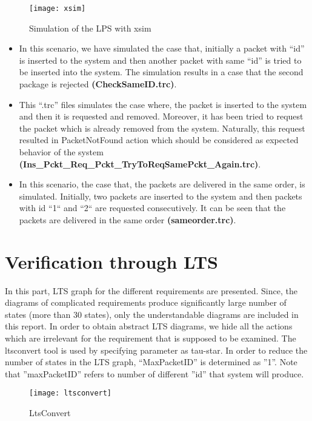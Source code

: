 \begin{figure}[h]
\center
\texttt{[image: xsim]}
\caption{Simulation of the LPS with xsim}
\label{fig:xsim1}
\end{figure}

\begin{itemize}
\item
In this scenario, we have simulated the case that, initially a packet with “id” is inserted to the system and then another packet with same “id” is tried to be inserted into the system. The simulation results in a case that the second package is rejected \textbf{(CheckSameID.trc)}.

\item  This “.trc” files simulates the case where, the packet is inserted to the system and then it is requested and removed. Moreover, it has been tried to request the packet which is already removed from the system. Naturally, this request resulted in PacketNotFound action which should be considered as expected behavior of the system\\ \textbf{(Ins\_Pckt\_Req\_Pckt\_TryToReqSamePckt\_Again.trc)}.

\item In this scenario, the case that, the packets are delivered in the same order, is simulated. Initially, two packets are inserted to the system and then packets with id ``1`` and ``2`` are requested consecutively. It can be seen that the packets are delivered in the same order \textbf{(sameorder.trc)}.
\end{itemize}

\section*{Verification through LTS}
In this part, LTS graph for the different requirements are presented. Since, the diagrams of complicated requirements produce significantly large number of states (more than 30 states), only the understandable diagrams are included in this report. In order to obtain abstract LTS diagrams, we hide all the actions which are irrelevant for the requirement that is supposed to be examined. The ltsconvert tool is used by specifying parameter as tau-star.  In order to reduce the number of states in the LTS graph, “MaxPacketID” is determined as ''1''. Note that ''maxPacketID'' refers to number of different ''id'' that system will produce.

\begin{figure}[h]
\center
\texttt{[image: ltsconvert]}
\caption{LtsConvert}
\label{fig:ltsconvert}
\end{figure}

